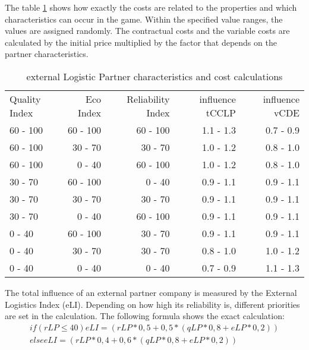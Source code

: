 The table \ref{External_logistic_partner_characteristics} shows how exactly the costs are related to the properties and which characteristics can occur in the game. Within the specified value ranges, the values are assigned randomly. 
The contractual costs and the variable costs are calculated by the initial price multiplied by the factor that depends on the partner characteristics.

\begin{table}[ht]
    \centering
    \begin{tabular}{|l|r|r|r|r|}
    \hline
    Quality Index & Eco Index & Reliability Index & influence tCCLP & influence vCDE \\
    60 - 100      & 60 - 100   & 60 - 100  & 1.1 - 1.3    & 0.7 - 0.9     \\
    60 - 100      & 30 - 70    & 30 - 70   & 1.0 - 1.2    & 0.8 - 1.0     \\
    60 - 100      & 0 - 40     & 60 - 100  & 1.0 - 1.2    & 0.8 - 1.0     \\
    30 - 70       & 60 - 100   & 0 - 40    & 0.9 - 1.1    & 0.9 - 1.1     \\
    30 - 70       & 30 - 70    & 30 - 70   & 0.9 - 1.1    & 0.9 - 1.1     \\
    30 - 70       & 0 - 40     & 60 - 100  & 0.9 - 1.1    & 0.9 - 1.1     \\
    0 - 40        & 60 - 100   & 30 - 70   & 0.9 - 1.1    & 0.9 - 1.1     \\
    0 - 40        & 30 - 70    & 30 - 70   & 0.8 - 1.0    & 1.0 - 1.2     \\
    0 - 40        & 0 - 40     & 0 - 40    & 0.7 - 0.9    & 1.1 - 1.3     \\
    \hline
    \end{tabular}
    \caption{external Logistic Partner characteristics and cost calculations}
    \label{External_logistic_partner_characteristics}
\end{table}

The total influence of an external partner company is measured by the External Logistics Index (eLI). Depending on how high its reliability is, different priorities are set in the calculation. The following formula shows the exact calculation: 
\begin{equation}
\begin{aligned}
    if (rLP ≤ 40) eLI = { (rLP*0,5 + 0,5*(qLP*0,8 + eLP*0,2)) } \\
    else eLI = { (rLP*0,4 + 0,6*(qLP*0,8 + eLP*0,2)) }
\end{aligned}
\end{equation}

